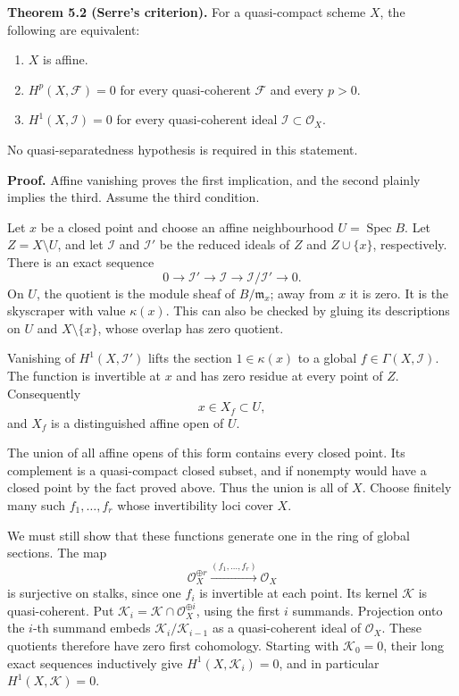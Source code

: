 \documentclass[11pt]{article}
\providecommand{\tightlist}{\setlength{\itemsep}{0pt}\setlength{\parskip}{0pt}}
\begin{document}
\textbf{Theorem 5.2 (Serre's criterion).} For a quasi-compact scheme
\(X\), the following are equivalent:

\begin{enumerate}
\def\labelenumi{\arabic{enumi}.}
\tightlist
\item
  \(X\) is affine.
\item
  \(H^p(X,\mathcal F)=0\) for every quasi-coherent \(\mathcal F\) and
  every \(p>0\).
\item
  \(H^1(X,\mathcal I)=0\) for every quasi-coherent ideal
  \(\mathcal I\subset\mathcal O_X\).
\end{enumerate}

No quasi-separatedness hypothesis is required in this statement.

\textbf{Proof.} Affine vanishing proves the first implication, and the
second plainly implies the third. Assume the third condition.

Let \(x\) be a closed point and choose an affine neighbourhood
\(U=\operatorname{Spec}B\). Let \(Z=X\setminus U\), and let
\(\mathcal I\) and \(\mathcal I'\) be the reduced ideals of \(Z\) and
\(Z\cup\{x\}\), respectively. There is an exact sequence \[
0\to\mathcal I'\to\mathcal I\to\mathcal I/\mathcal I'\to0.
\] On \(U\), the quotient is the module sheaf of \(B/\mathfrak m_x\);
away from \(x\) it is zero. It is the skyscraper with value
\(\kappa(x)\). This can also be checked by gluing its descriptions on
\(U\) and \(X\setminus\{x\}\), whose overlap has zero quotient.

Vanishing of \(H^1(X,\mathcal I')\) lifts the section \(1\in\kappa(x)\)
to a global \(f\in\Gamma(X,\mathcal I)\). The function is invertible at
\(x\) and has zero residue at every point of \(Z\). Consequently \[
x\in X_f\subset U,
\] and \(X_f\) is a distinguished affine open of \(U\).

The union of all affine opens of this form contains every closed point.
Its complement is a quasi-compact closed subset, and if nonempty would
have a closed point by the fact proved above. Thus the union is all of
\(X\). Choose finitely many such \(f_1,\ldots,f_r\) whose invertibility
loci cover \(X\).

We must still show that these functions generate one in the ring of
global sections. The map \[
\mathcal O_X^{\oplus r}\xrightarrow{(f_1,\ldots,f_r)}\mathcal O_X
\] is surjective on stalks, since one \(f_i\) is invertible at each
point. Its kernel \(\mathcal K\) is quasi-coherent. Put
\(\mathcal K_i=\mathcal K\cap\mathcal O_X^{\oplus i}\), using the first
\(i\) summands. Projection onto the \(i\)-th summand embeds
\(\mathcal K_i/\mathcal K_{i-1}\) as a quasi-coherent ideal of
\(\mathcal O_X\). These quotients therefore have zero first cohomology.
Starting with \(\mathcal K_0=0\), their long exact sequences inductively
give \(H^1(X,\mathcal K_i)=0\), and in particular
\(H^1(X,\mathcal K)=0\).
\end{document}
